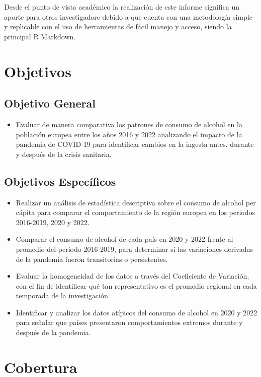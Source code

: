 \documentclass[
]{article}
\begin{document}
Desde el punto de vista académico la realización de este informe
significa un aporte para otros investigadore debido a que cuenta con una
metodología simple y replicable con el uso de herramientas de fácil
manejo y acceso, siendo la principal R Markdown.

\section{Objetivos}

\subsection{Objetivo General}
\begin{itemize}
  \item{Evaluar de manera comparativa los patrones de consumo de alcohol en la población europea entre los años 2016 y 2022 analizando el impacto de la pandemia de COVID-19 para identificar cambios en la ingesta antes, durante y después de la crisis sanitaria.}
\end{itemize}

\subsection{Objetivos Específicos}
\begin{itemize}
  \item{Realizar un análisis de estadística descriptiva sobre el consumo de alcohol per cápita para comparar el comportamiento de la región europea en los periodos 2016-2019, 2020 y 2022.}
  \item{Comparar el consumo de alcohol de cada país en 2020 y 2022 frente al promedio del periodo 2016-2019, para determinar si las variaciones derivadas de la pandemia fueron transitorias o persistentes.}
  \item{Evaluar la homogeneidad de los datos a través del Coeficiente de Variación, con el fin de identificar qué tan representativo es el promedio regional en cada temporada de la investigación.}
  \item{Identificar y analizar los datos atípicos del consumo de alcohol en 2020 y 2022 para señalar que países presentaron comportamientos extremos durante y después de la pandemia.}
\end{itemize}

\section{Cobertura}
\end{document}
